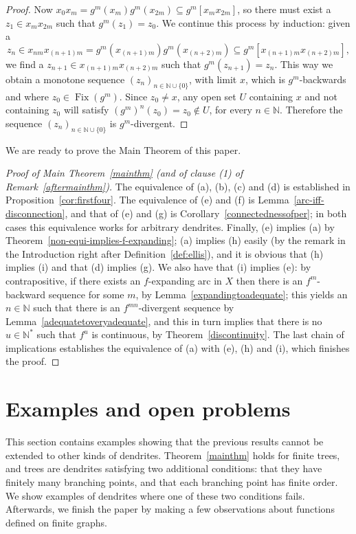 \documentclass[12pt]{amsart}
\theoremstyle{definition}
\numberwithin{equation}{section}
\DeclareMathOperator{\fix}{Fix}
\begin{document}
\begin{proof}
Now $x_0 x_m=g^m(x_m) g^m(x_{2m})\subseteq g^m[x_m x_{2m}]$, so there must exist a $z_1\in x_m x_{2m}$ such that $g^m(z_1)=z_0$. We continue this process by induction: given a 
$$
z_n\in x_{nm} x_{(n+1)m}=g^m(x_{(n+1)m})g^m(x_{(n+2)m})\subseteq g^m[x_{(n+1)m} x_{(n+2)m}],
$$
\noindent we find a $z_{n+1}\in x_{(n+1)m} x_{(n+2)m}$ such that $g^m(z_{n+1})=z_n$. This way we obtain a monotone sequence $(z_n)_{n\in\mathbb N\cup\{0\}}$, with limit $x$, which is $g^m$-backwards and where $z_0\in\fix(g^m)$. Since $z_0\neq x$, any open set $U$ containing $x$ and not containing $z_0$ will satisfy $(g^m)^n(z_0)=z_0\notin U$, for every $n\in\mathbb N$. Therefore the sequence 
$(z_n)_{n\in\mathbb N\cup\{0\}}$ is $g^m$-divergent.
\end{proof}

We are ready to prove the Main Theorem of this paper.

\begin{proof}[Proof of Main Theorem~\ref{mainthm} \emph{(}and of clause \emph{(1)} of Remark~\ref{aftermainthm}\emph{)}]
The equivalence of (a), (b), (c) and (d) is established in Proposition~\ref{cor:firstfour}. The equivalence of (e) and 
(f) is Lemma~\ref{arc-iff-disconnection}, and that of (e) and (g) is Corollary~\ref{connectednessofper}; in both cases this equivalence works for arbitrary dendrites. Finally, (e) implies (a) by Theorem~\ref{non-equi-implies-f-expanding}; (a) implies (h) easily (by the remark in the Introduction right after Definition~\ref{def:ellis}), and it is obvious that (h) implies (i) and that (d) implies (g). We also have that (i) implies (e): by contrapositive, if there exists an $f$-expanding arc in $X$ then there is an $f^m$-backward sequence for some $m$, by Lemma~\ref{expandingtoadequate}; this yields an $n\in\mathbb N$ such that there is an 
$f^{mn}$-divergent sequence by Lemma~\ref{adequatetoveryadequate}, and this in turn implies that there is no $u\in\mathbb N^*$ such that $f^u$ is continuous, by Theorem~\ref{discontinuity}. The last chain of implications establishes the equivalence of (a) with (e), (h) and (i), which finishes the proof.
\end{proof}

\section{Examples and open problems}

This section contains examples showing that the previous results cannot be extended to other kinds of dendrites. Theorem~\ref{mainthm} holds for finite trees, and trees are dendrites satisfying two additional conditions: that they have finitely many branching points, and that each branching point has finite order. We show examples of dendrites where one of these two conditions fails. Afterwards, we finish the paper by making a few observations about functions defined on finite graphs.
\end{document}
